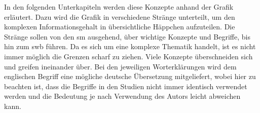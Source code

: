 In den folgenden Unterkapiteln werden diese Konzepte anhand der Grafik erläutert. Dazu wird die Grafik in verschiedene Stränge unterteilt, um den komplexen Informationsgehalt in übersichtliche Häppchen aufzuteilen. Die Stränge sollen von den \gls{sm} ausgehend, über wichtige Konzepte und Begriffe, bis hin zum \gls{swb} führen. Da es sich um eine komplexe Thematik handelt, ist es nicht immer möglich die Grenzen scharf zu ziehen. Viele Konzepte überschneiden sich und greifen ineinander über.\newline 
Bei den jeweiligen Worterklärungen wird dem englischen Begriff eine mögliche deutsche Übersetzung mitgeliefert, wobei hier zu beachten ist, dass die Begriffe in den Studien nicht immer identisch verwendet werden und die Bedeutung je nach Verwendung des Autors leicht abweichen kann.


